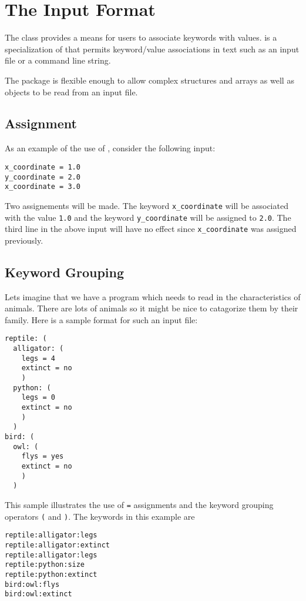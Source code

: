 
\section{The  Input Format}
\label{ParsedKeyVal}
\label{KeyVal}

The  class provides a means for users to associate keywords
with values.   is a specialization of 
that permits keyword/value associations in text such as an input file or a
command line string.

The package is flexible enough to allow complex structures and arrays as
well as objects to be read from an input file.

\subsection{Assignment}

As an example of the use of , consider the following
input:
\begin{verbatim}
x_coordinate = 1.0
y_coordinate = 2.0
x_coordinate = 3.0
\end{verbatim}
Two assignements will be made.  The keyword \verb|x_coordinate| will be
associated with the value \verb|1.0| and the keyword \verb|y_coordinate|
will be assigned to \verb|2.0|.  The third line in the above input
will have no effect since \verb|x_coordinate| was assigned previously.

\subsection{Keyword Grouping}
\label{pkvgroup}

Lets imagine that we have a program which needs to read in the
characteristics of animals.  There are lots of animals so it might be
nice to catagorize them by their family.  Here is a sample format for
such an input file:
\begin{verbatim}
reptile: (
  alligator: (
    legs = 4
    extinct = no
    )
  python: (
    legs = 0
    extinct = no
    )
  )
bird: (
  owl: (
    flys = yes
    extinct = no
    )
  )
\end{verbatim}

This sample illustrates the use of  \verb|=| 
assignments and the keyword grouping operators \verb|(| and \verb|)|.
The keywords in this example are
\begin{verbatim}
reptile:alligator:legs
reptile:alligator:extinct
reptile:alligator:legs
reptile:python:size
reptile:python:extinct
bird:owl:flys
bird:owl:extinct
\end{verbatim}

